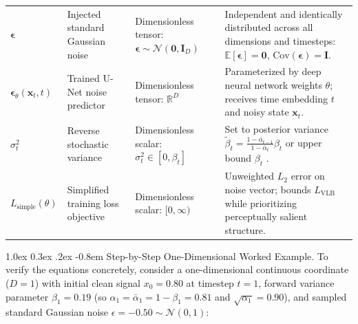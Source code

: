 \documentclass[10pt,a4paper]{article}
\makeatletter
\renewcommand\paragraph{\@startsection{paragraph}{4}{\z@}%
                                    {1.0ex \@plus 0.3ex \@minus .2ex}%
                                    {-0.8em}%
                                    {\normalfont\normalsize\bfseries}}
\makeatother
\begin{document}
\begin{table}[htbp]
\begin{tabularx}{\textwidth}{l p{3.4cm} p{2.4cm} X}
$\bm{\epsilon}$ & Injected standard Gaussian noise & Dimensionless tensor: $\bm{\epsilon} \sim \mathcal{N}(\mathbf{0}, \mathbf{I}_D)$ & Independent and identically distributed across all dimensions and timesteps: $\mathbb{E}[\bm{\epsilon}] = \mathbf{0}$, $\text{Cov}(\bm{\epsilon}) = \mathbf{I}$. \\
$\bm{\epsilon}_\theta(\mathbf{x}_t, t)$ & Trained U-Net noise predictor & Dimensionless tensor: $\mathbb{R}^D$ & Parameterized by deep neural network weights $\theta$; receives time embedding $t$ and noisy state $\mathbf{x}_t$. \\
$\sigma_t^2$ & Reverse stochastic variance & Dimensionless scalar: $\sigma_t^2 \in [0, \beta_t]$ & Set to posterior variance $\tilde{\beta}_t = \frac{1-\bar{\alpha}_{t-1}}{1-\bar{\alpha}_t}\beta_t$ or upper bound $\beta_t$ \cite{ho2020denoising}. \\
$L_{\text{simple}}(\theta)$ & Simplified training loss objective & Dimensionless scalar: $[0, \infty)$ & Unweighted $L_2$ error on noise vector; bounds $L_{\text{VLB}}$ while prioritizing perceptually salient structure. \\
\bottomrule
\end{tabularx}
\end{table}

\paragraph{Step-by-Step One-Dimensional Worked Example.}
To verify the equations concretely, consider a one-dimensional continuous coordinate ($D=1$) with initial clean signal $x_0 = 0.80$ at timestep $t=1$, forward variance parameter $\beta_1 = 0.19$ (so $\alpha_1 = \bar{\alpha}_1 = 1 - \beta_1 = 0.81$ and $\sqrt{\alpha_1} = 0.90$), and sampled standard Gaussian noise $\epsilon = -0.50 \sim \mathcal{N}(0, 1)$:
\end{document}
